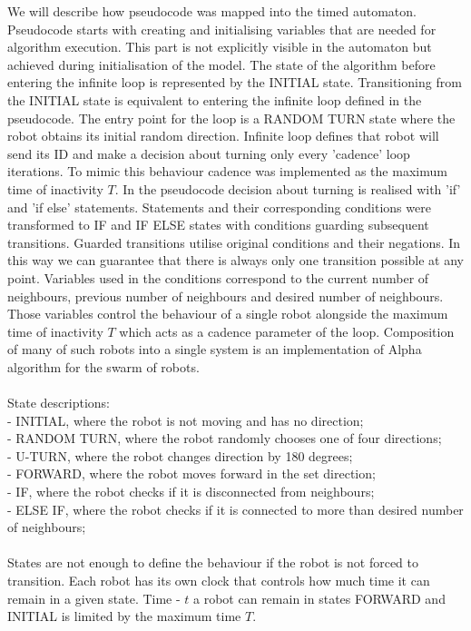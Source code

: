 We will describe how pseudocode was mapped into the timed automaton. Pseudocode starts with creating and initialising variables that are needed for algorithm execution. This part is not explicitly visible in the automaton but achieved during initialisation of the model. The state of the algorithm before entering the infinite loop is represented by the INITIAL state. Transitioning from the INITIAL state is equivalent to entering the infinite loop defined in the pseudocode. The entry point for the loop is a RANDOM TURN state where the robot obtains its initial random direction. Infinite loop defines that robot will send its ID and make a decision about turning only every 'cadence' loop iterations. To mimic this behaviour cadence was implemented as the maximum time of inactivity $T$. In the pseudocode  decision about turning is realised with 'if' and 'if else' statements. Statements and their corresponding conditions were transformed to IF and IF ELSE states with conditions guarding subsequent transitions. Guarded transitions utilise original conditions and their negations. In this way we can guarantee that there is always only one transition possible at any point. Variables used in the conditions correspond to the current number of neighbours, previous number of neighbours and desired number of neighbours. Those variables control the behaviour of a single robot alongside the maximum time of inactivity $T$ which acts as a cadence parameter of the loop. Composition of many of such robots into a single system is an implementation of Alpha algorithm for the swarm of robots.\\\\
State descriptions:\\
- INITIAL, where the robot is not moving and has no direction;\\
- RANDOM TURN, where the robot randomly chooses one of four directions;\\
- U-TURN, where the robot changes direction by 180 degrees;\\
- FORWARD, where the robot moves forward in the set direction;\\
- IF, where the robot checks if it is disconnected from neighbours;\\
- ELSE IF, where the robot checks if it is connected to more than desired number of neighbours;\\\\
States are not enough to define the behaviour if the robot is not forced to transition. Each robot has its own clock that controls how much time it can remain in a given state. Time - $t$ a robot can remain in states FORWARD and INITIAL is limited by the maximum time $T$.
